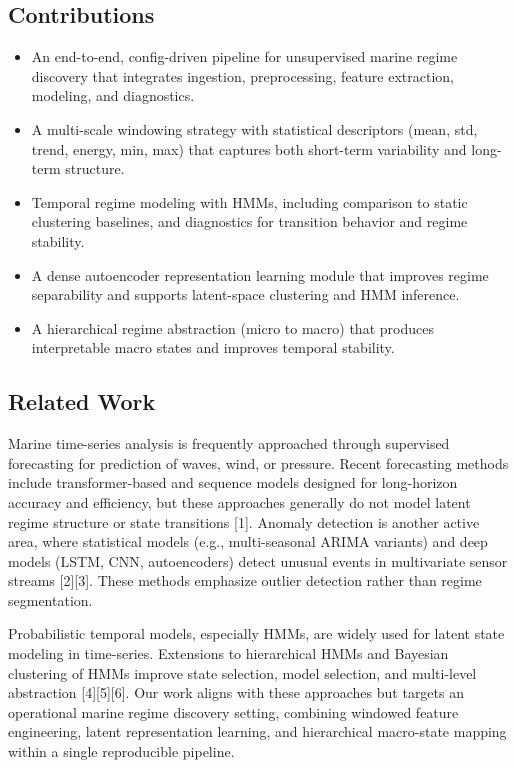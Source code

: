 \documentclass[conference]{IEEEtran}
\begin{document}
\subsection{Contributions}
\begin{itemize}
\item An end-to-end, config-driven pipeline for unsupervised marine regime discovery that integrates ingestion, preprocessing, feature extraction, modeling, and diagnostics.
\item A multi-scale windowing strategy with statistical descriptors (mean, std, trend, energy, min, max) that captures both short-term variability and long-term structure.
\item Temporal regime modeling with HMMs, including comparison to static clustering baselines, and diagnostics for transition behavior and regime stability.
\item A dense autoencoder representation learning module that improves regime separability and supports latent-space clustering and HMM inference.
\item A hierarchical regime abstraction (micro to macro) that produces interpretable macro states and improves temporal stability.
\end{itemize}

\subsection{Related Work}
Marine time-series analysis is frequently approached through supervised forecasting for prediction of waves, wind, or pressure. Recent forecasting methods include transformer-based and sequence models designed for long-horizon accuracy and efficiency, but these approaches generally do not model latent regime structure or state transitions [1]. Anomaly detection is another active area, where statistical models (e.g., multi-seasonal ARIMA variants) and deep models (LSTM, CNN, autoencoders) detect unusual events in multivariate sensor streams [2][3]. These methods emphasize outlier detection rather than regime segmentation.

Probabilistic temporal models, especially HMMs, are widely used for latent state modeling in time-series. Extensions to hierarchical HMMs and Bayesian clustering of HMMs improve state selection, model selection, and multi-level abstraction [4][5][6]. Our work aligns with these approaches but targets an operational marine regime discovery setting, combining windowed feature engineering, latent representation learning, and hierarchical macro-state mapping within a single reproducible pipeline.
\end{document}
